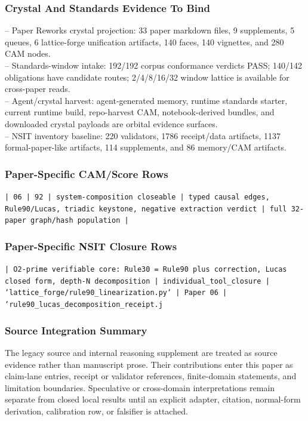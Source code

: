 \documentclass[11pt]{article}
\begin{document}
\subsubsection*{Crystal And Standards Evidence To Bind}

\noindent{}-- Paper Reworks crystal projection: 33 paper markdown files, 9 supplements, 5 queues, 6 lattice-forge unification artifacts, 140 faces, 140 vignettes, and 280 CAM nodes.\\
\noindent{}-- Standards-window intake: 192/192 corpus conformance verdicts PASS; 140/142 obligations have candidate routes; 2/4/8/16/32 window lattice is available for cross-paper reads.\\
\noindent{}-- Agent/crystal harvest: agent-generated memory, runtime standards starter, current runtime build, repo-harvest CAM, notebook-derived bundles, and downloaded crystal payloads are orbital evidence surfaces.\\
\noindent{}-- NSIT inventory baseline: 220 validators, 1786 receipt/data artifacts, 1137 formal-paper-like artifacts, 114 supplements, and 86 memory/CAM artifacts.\\

\subsubsection*{Paper-Specific CAM/Score Rows}

\noindent\texttt{| 06 | 92 | system-composition closeable | typed causal edges, Rule90/Lucas, triadic keystone, negative extraction verdict | full 32-paper graph/hash population |}\\

\subsubsection*{Paper-Specific NSIT Closure Rows}

\noindent\texttt{| O2-prime verifiable core: Rule30 = Rule90 plus correction, Lucas closed form, depth-N decomposition | individual\_tool\_closure | `lattice\_forge/rule90\_linearization.py` | Paper 06 | `rule90\_lucas\_decomposition\_receipt.j}\\

\subsubsection*{Source Integration Summary}

The legacy source and internal reasoning supplement are treated as source
evidence rather than manuscript prose. Their contributions enter this paper as
claim-lane entries, receipt or validator references, finite-domain statements,
and limitation boundaries. Speculative or cross-domain interpretations remain
separate from closed local results until an explicit adapter, citation,
normal-form derivation, calibration row, or falsifier is attached.
\end{document}
